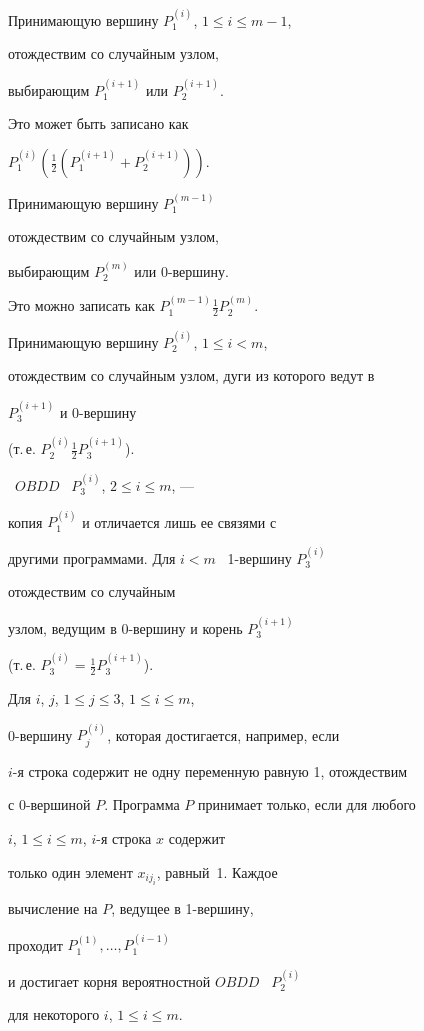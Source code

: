 \begin{pf}
Принимающую вершину $P_1^{(i)}$, $1\le i\le m-1$,


отождествим со случайным узлом,


выбирающим $P_1^{(i+1)}$ или $P_2^{(i+1)}$.


Это может быть записано как


$P_1^{(i)}(\frac{1}{2}(P_1^{(i+1)}+P_2^{(i+1)}))$.


Принимающую вершину $P_1^{(m-1)}$


отождествим со случайным узлом,


выбирающим $P_2^{(m)}$ или 0-вершину.


Это можно записать как $P_1^{(m-1)}\frac{1}{2}P_2^{(m)}$.


Принимающую вершину $P_2^{(i)}$, $1\le i<m$,


отождествим со случайным узлом, дуги из которого ведут в


$P_3^{(i+1)}$ и 0-вершину


(т.\,е. $P_2^{(i)}\frac{1}{2}P_3^{(i+1)}$).




\ $OBDD$ \ $P_3^{(i)}$, $2\le i\le m$, ---


копия $P_1^{(i)}$ и отличается лишь ее связями с


другими программами. Для $i<m$ \ 1-вершину $P_3^{(i)}$


отождествим со случайным


узлом, ведущим в 0-вершину и корень $P_3^{(i+1)}$


(т.\,е. $P_3^{(i)}=\frac{1}{2}P_3^{(i+1)}$).





Для $i$, $j$, $1\le j\le 3$, $1\le i\le m$,


0-вершину $P_j^{(i)}$, которая достигается, например, если


$i$-я строка содержит не одну переменную равную 1, отождествим 


с 0-вершиной $P$. Программа $P$ принимает только, если для любого


$i$, $1\le i \le m$, $i$-я строка $x$ содержит


только один элемент $x_{ij_i}$, равный~1. Каждое


вычисление на $P$, ведущее в 1-вершину,


проходит $P_1^{(1)},\dotsc,P_1^{(i-1)}$


и достигает корня вероятностной $OBDD$ \ $P_2^{(i)}$


для некоторого $i$, $1\le i\le m$.



\end{pf}
